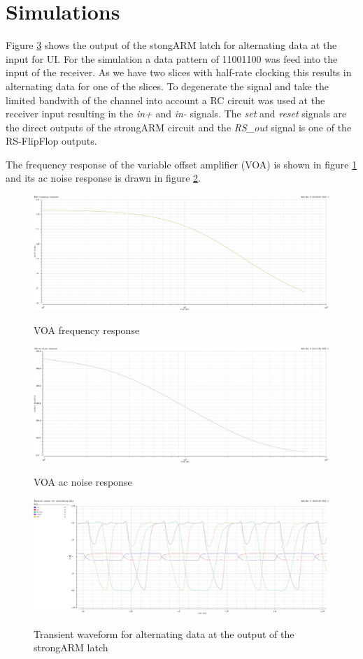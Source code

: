 \section{Simulations}
\label{sec:simulations}
Figure \ref{fig:strongARM_out} shows the output of the stongARM latch for alternating data at the input for \unit[6]{UI}. For the simulation a data pattern of 11001100 was feed into the input of the receiver. As we have two slices with half-rate clocking this results in alternating data for one of the slices. To degenerate the signal and take the limited bandwith of the channel into account a RC circuit was used at the receiver input resulting in the \textit{in+} and \textit{in-} signals. The \textit{set} and \textit{reset} signals are the direct outputs of the strongARM circuit and the \textit{RS\_out} signal is one of the RS-FlipFlop outputs.

The frequency response of the variable offset amplifier (VOA) is shown in figure \ref{fig:voa_freq} and its ac noise response is drawn in figure \ref{fig:voa_noise}.

\begin{figure}[H]
  \centering
  {\includegraphics[scale=0.35]{img/voa_freq.jpg}}
  \caption{VOA frequency response}
  \label{fig:voa_freq}
\end{figure}

\begin{figure}[H]
  \centering
  {\includegraphics[scale=0.35]{img/voa_noise.jpg}}
  \caption{VOA ac noise response}
  \label{fig:voa_noise}
\end{figure}

\begin{figure}[H]
  \centering
  {\includegraphics[angle=90, scale=0.45]{img/output_alt_trans.jpg}}
  \caption{Transient waveform for alternating data at the output of the strongARM latch}
  \label{fig:strongARM_out}
\end{figure}